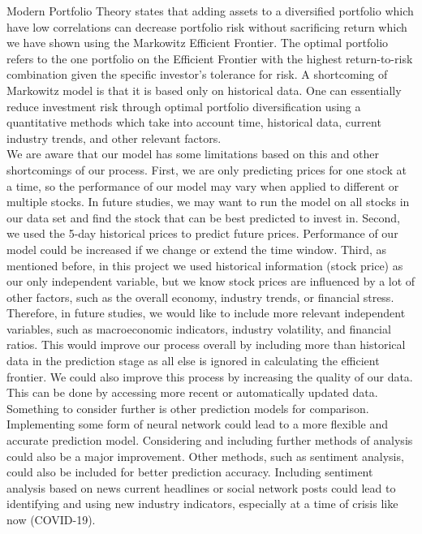 \documentclass[11pt, oneside]{article}   	%
\begin{document}
 Modern Portfolio Theory states that adding assets to a diversified portfolio which have low correlations can decrease portfolio risk without sacrificing return which we have shown using the Markowitz Efficient Frontier. The optimal portfolio refers to the one portfolio on the Efficient Frontier with the highest return-to-risk combination given the specific investor's tolerance for risk. A shortcoming of Markowitz model is that it is based only on historical data. One can essentially reduce investment risk through optimal portfolio diversification using a quantitative methods which take into account time, historical data, current industry trends, and other relevant factors. \\
 
 We are aware that our model has some limitations based on this and other shortcomings of our process. First, we are only predicting prices for one stock at a time, so the performance of our model may vary when applied to different or multiple stocks. In future studies, we may want to run the model on all stocks in our data set and find the stock that can be best predicted to invest in. Second, we used the 5-day historical prices to predict future prices. Performance of our model  could be increased if we change or extend the time window. Third, as mentioned before, in this project we used historical information (stock price) as our only independent variable, but we know stock prices are influenced by a lot of other factors, such as the overall economy, industry trends, or financial stress. Therefore, in future studies, we would like to include more relevant independent variables, such as macroeconomic indicators, industry volatility, and financial ratios. This would improve our process overall by including more than historical data in the prediction stage as all else is ignored in calculating the efficient frontier.  We could also improve this process by increasing the quality of our data. This can be done by accessing more recent or automatically updated data. Something to consider further is other prediction models for comparison. Implementing some form of neural network could lead to a more flexible and accurate prediction model. Considering and including further methods of analysis could also be a major improvement. Other methods, such as sentiment analysis, could also be included for better prediction accuracy. Including sentiment analysis based on news current headlines or social network posts could lead to identifying and using new industry indicators, especially at a time of crisis like now (COVID-19).
   
\end{document}
